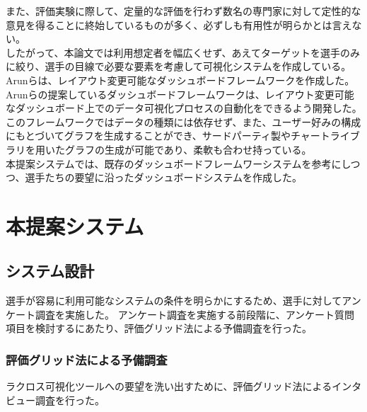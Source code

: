 \documentclass[sotsuron]{kuee}
\begin{document}
	また、評価実験に際して、定量的な評価を行わず数名の専門家に対して定性的な意見を得ることに終始しているものが多く、必ずしも有用性が明らかとは言えない。
	\\したがって、本論文では利用想定者を幅広くせず、あえてターゲットを選手のみに絞り、選手の目線で必要な要素を考慮して可視化システムを作成している。
	\\Arunらは、レイアウト変更可能なダッシュボードフレームワークを作成した。
	Arunらの提案しているダッシュボードフレームワークは、レイアウト変更可能なダッシュボード上でのデータ可視化プロセスの自動化をできるよう開発した。
	このフレームワークではデータの種類には依存せず、また、ユーザー好みの構成にもとづいてグラフを生成することができ、サードパーティ製やチャートライブラリを用いたグラフの生成が可能であり、柔軟も合わせ持っている。
	\\本提案システムでは、既存のダッシュボードフレームワーシステムを参考にしつつ、選手たちの要望に沿ったダッシュボードシステムを作成した。

\chapter{本提案システム}
	\section{システム設計}
		選手が容易に利用可能なシステムの条件を明らかにするため、選手に対してアンケート調査を実施した。
		アンケート調査を実施する前段階に、アンケート質問項目を検討するにあたり、評価グリッド法による予備調査を行った。
		\subsection{評価グリッド法による予備調査}
			ラクロス可視化ツールへの要望を洗い出すために、評価グリッド法によるインタビュー調査を行った。
\end{document}
